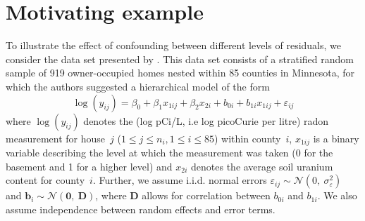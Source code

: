\documentclass{article} %
\newcommand{\al}[1]{{\color{red} #1}}
\begin{document}
\section{Motivating example}\label{sec:ex}
To illustrate the effect of confounding between different levels of residuals, we consider the data set presented by
 \cite{Gelman:2006ue}. This data set consists of a stratified random sample of 919 owner-occupied homes nested within 85 counties in Minnesota, for which the authors suggested a hierarchical model of the form
%
\begin{equation}\label{eq:radon}
  \log(y_{ij}) = \beta_0 + \beta_1 x_{1ij} + \beta_2 x_{2i} + b_{0i} + b_{1i} x_{1ij}  + \varepsilon_{ij}
\end{equation}
%
where   $\log(y_{ij})$ denotes the (log pCi/L, i.e log picoCurie per litre) radon measurement for house~$j$ ($1 \le j \le n_i, 1 \le i \le 85$) within county~$i$,
 $x_{1ij}$ is a binary variable describing the level at which the measurement was taken (0 for the basement and 1 for a higher level) and $x_{2i}$ denotes the average soil uranium content for  county~$i$. 
 Further, we assume i.i.d. normal errors $\varepsilon_{ij} \sim \mathcal{N} (0,\ \sigma^2_{\varepsilon})$  and $\bm{b}_i \sim \mathcal{N}(\bm{0},\ \bm{D})$, where $\bm{D}$ allows for correlation between $b_{0i}$ and $b_{1i}$. We also assume independence between random effects and error \al{terms}. 
\end{document}

